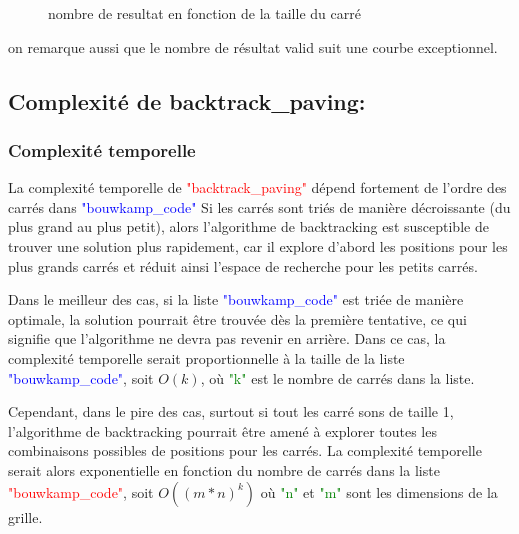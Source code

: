 \documentclass{article}
\begin{document}
\begin{figure}[htbp]
  \centering
  
  \caption{nombre de resultat en fonction de la taille du carré}
  \label{fig3}
\end{figure}

on remarque aussi que le nombre de résultat valid suit une courbe exceptionnel.

\newpage
\subsection{ Complexité de backtrack\_paving:}
\subsubsection{Complexité temporelle}

La complexité temporelle de \textcolor{red}{"backtrack\_paving"} dépend fortement de l'ordre des carrés dans \textcolor{blue}{"bouwkamp\_code"} Si les carrés sont triés de manière décroissante (du plus grand au plus petit), alors l'algorithme de backtracking est susceptible de trouver une solution plus rapidement, car il explore d'abord les positions pour les plus grands carrés et réduit ainsi l'espace de recherche pour les petits carrés.\newline

Dans le meilleur des cas, si la liste \textcolor{blue}{"bouwkamp\_code"} est triée de manière optimale, la solution pourrait être trouvée dès la première tentative, ce qui signifie que l'algorithme ne devra pas revenir en arrière. Dans ce cas, la complexité temporelle serait proportionnelle à la taille de la liste \textcolor{blue}{"bouwkamp\_code"}, soit $O(k)$, où \textcolor{green}{"k"} est le nombre de carrés dans la liste.\newline

Cependant, dans le pire des cas, surtout si tout les carré sons de taille 1, l'algorithme de backtracking pourrait être amené à explorer toutes les combinaisons possibles de positions pour les carrés. La complexité temporelle serait alors exponentielle en fonction du nombre de carrés dans la liste \textcolor{red}{"bouwkamp\_code"}, soit $O((m*n)^k)$ où \textcolor{green}{"n"} et \textcolor{green}{"m"} sont les dimensions de la grille.\newline
\end{document}
